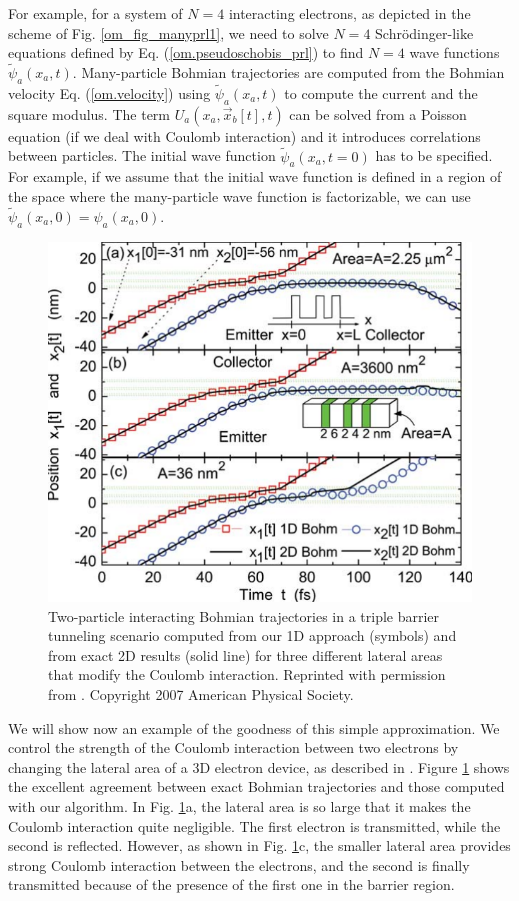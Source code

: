 \documentclass[nofootinbib, secnumarabic, amsmath, nobibnotes,10pt,aps,pra]{revtex4-1}
\newcommand{\fref}[1]{Fig. \ref{#1}}
\newcommand{\eref}[1]{Eq. (\ref{#1})}
\newcommand{\Fref}[1]{Figure \ref{#1}}
\begin{document}
For example, for a system of $N = 4$ interacting electrons, as
depicted in the scheme  of \fref{om_fig_manyprl1}, we need to solve
$N = 4$ Schr\"odinger-like  equations defined by  \eref{om.pseudoschobis_prl} to find $N =
4$ wave functions $\tilde{\psi}_a(x_a,t)$. Many-particle Bohmian
trajectories are computed from the Bohmian velocity
\eref{om.velocity} using $\tilde{\psi}_a(x_a,t)$ to compute the
current and the square modulus. The term \textit{$U_{a}(x_{a},\vec
x_{b}[t],t)$} can be solved from a Poisson equation (if we deal with
Coulomb interaction) and it introduces correlations between
particles. The initial wave function $\tilde{\psi}_a(x_a,t = 0)$ has
to be specified. For example, if we assume that the initial wave
function is defined in a region of the space where the many-particle
wave function is factorizable, we can use $\tilde{\psi}_a(x_a,0) =
{\psi}_a(x_a,0)$.

\begin{figure}
\centering
\includegraphics{F1_05.pdf}
\caption{Two-particle interacting Bohmian trajectories in a triple barrier tunneling scenario
computed from our 1D approach (symbols) and from exact 2D results
(solid line) for three different lateral areas that modify the
Coulomb interaction. Reprinted with permission from
\cite{om.oriolsprl}. Copyright 2007 American Physical Society.}
\label{om_fig_prl1}
\end{figure}

We will show now an example of the goodness of this simple
approximation. We control the strength of the Coulomb interaction
between two electrons by changing the lateral area of a 3D electron
device, as described in \cite{om.oriolsprl}. \Fref{om_fig_prl1}
shows the excellent agreement between exact Bohmian trajectories and
those computed with our algorithm. In \fref{om_fig_prl1}a, the
lateral area is so large that it makes the Coulomb interaction quite
negligible. The first electron is transmitted, while the second is
reflected. However, as shown in \fref{om_fig_prl1}c, the smaller lateral area
provides strong Coulomb interaction between the electrons, and the
second is finally transmitted because of the presence of the first
one in the barrier region.
\end{document}

